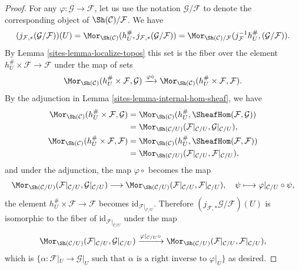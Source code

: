 \begin{proof}

For any $\varphi : \mathcal{G} \to \mathcal{F}$, let us use
the notation $\mathcal{G}/\mathcal{F}$ to denote the corresponding
object of $\Sh(\mathcal{C})/\mathcal{F}$. We have
$$
(j_{\mathcal{F}, *}(\mathcal{G}/\mathcal{F}))(U) =
\Mor_{\Sh(\mathcal{C})}(h_U^\#, j_{\mathcal{F}, *}(\mathcal{G}/\mathcal{F})) =
\Mor_{\Sh(\mathcal{C})/\mathcal{F}}(j_{\mathcal{F}}^{-1}h_U^{\#},
(\mathcal{G}/\mathcal{F})).
$$
By Lemma \ref{sites-lemma-localize-topos} this set is the fiber over
the element $h_U^\# \times \mathcal{F} \to \mathcal{F}$ under the
map of sets
$$
\Mor_{\Sh(\mathcal{C})}(h_U^\# \times \mathcal{F}, \mathcal{G})
\xrightarrow{\varphi \circ}
\Mor_{\Sh(\mathcal{C})}(h_U^\# \times \mathcal{F}, \mathcal{F}).
$$
By the adjunction in Lemma \ref{sites-lemma-internal-hom-sheaf}, we have
\begin{align*}
\Mor_{\Sh(\mathcal{C})}(h_U^{\#}\times\mathcal{F}, \mathcal{G})
& =
\Mor_{\Sh(\mathcal{C})}(h_U^{\#},\SheafHom(\mathcal{F}, \mathcal{G})) \\
& =
\Mor_{\Sh(\mathcal{C}/U)}(\mathcal{F}|_{\mathcal{C}/U},
\mathcal{G}|_{\mathcal{C}/U}), \\
\Mor_{\Sh(\mathcal{C})}(h_U^{\#} \times \mathcal{F}, \mathcal{F})
& =
\Mor_{\Sh(\mathcal{C})}(h_U^{\#},\SheafHom(\mathcal{F},\mathcal{F})) \\
& =
\Mor_{\Sh(\mathcal{C}/U)}(\mathcal{F}|_{\mathcal{C}/U},
\mathcal{F}|_{\mathcal{C}/U}),
\end{align*}
and under the adjunction, the map $\varphi\circ$ becomes the map
$$
\Mor_{\Sh(\mathcal{C}/U)}(\mathcal{F}|_{\mathcal{C}/U},
\mathcal{G}|_{\mathcal{C}/U})
\longrightarrow
\Mor_{\Sh(\mathcal{C}/U)}(\mathcal{F}|_{\mathcal{C}/U},
\mathcal{F}|_{\mathcal{C}/U}),\quad
\psi \longmapsto \varphi|_{\mathcal{C}/U} \circ \psi,
$$
the element $h_U^\# \times \mathcal{F} \to \mathcal{F}$
becomes $\text{id}_{\mathcal{F}|_{\mathcal{C}/U}}$.
Therefore $(j_{\mathcal{F}, *}\mathcal{G}/\mathcal{F})(U)$
is isomorphic to the fiber of
$\text{id}_{\mathcal{F}|_{\mathcal{C}/U}}$ under the map
$$
\Mor_{\Sh(\mathcal{C}/U)}(\mathcal{F}|_{\mathcal{C}/U},
\mathcal{G}|_{\mathcal{C}/U})
\xrightarrow{\varphi|_{\mathcal{C}/U}\circ}
\Mor_{\Sh(\mathcal{C}/U)}(\mathcal{F}|_{\mathcal{C}/U},
\mathcal{F}|_{\mathcal{C}/U}),
$$
which is $\{\alpha : \mathcal{F}|_U \to \mathcal{G}|_U
\text{ such that } \alpha \text{ is a right inverse to }\varphi|_U \}$
as desired.
\end{proof}

